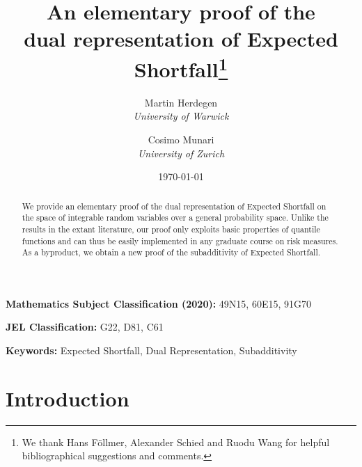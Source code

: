\documentclass[12pt]{article}
\theoremstyle{plain}
\theoremstyle{definition}
\theoremstyle{remark}
\numberwithin{equation}{section}
\def\JELclassification{\vspace{.5em}
{\noindent\textbf{JEL classification}:\,\relax%
}}
\def\MSCclassification{\vspace{.5em}
{\noindent\textbf{MSC}:\,\relax%
}}
\begin{document}

\title{An elementary proof of the\\ dual representation of Expected Shortfall\footnote{We thank Hans F\"{o}llmer, Alexander Schied and Ruodu Wang for helpful bibliographical suggestions and comments.}}

\author{
Martin Herdegen \\ \textit{University of Warwick}
\and
Cosimo Munari \\ \textit{University of Zurich}
}

\date{\today}

\maketitle

\begin{abstract}
We provide an elementary proof of the dual representation of Expected Shortfall on the space of integrable random variables over a general probability space. Unlike the results in the extant literature, our proof only exploits basic properties of quantile functions and can thus be easily implemented in any graduate course on risk measures. As a byproduct, we obtain a new proof of the subadditivity of Expected Shortfall.
\end{abstract}

\bigskip
\noindent\textbf{Mathematics Subject Classification (2020):} 49N15, 60E15, 91G70

\bigskip
\noindent\textbf{JEL Classification:}  G22, D81, C61

\bigskip
\noindent\textbf{Keywords:} Expected Shortfall, Dual Representation, Subadditivity




\section{Introduction}
\end{document}
